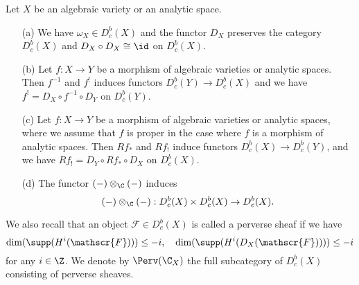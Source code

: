 \begin{theorem}\label{sheaf on LHS constructible sheaf functor prop}
Let $X$ be an algebraic variety or an analytic space.
\begin{enumerate}
    \item[(a)] We have $\omega_X\in D^b_c(X)$ and the functor $D_X$ preserves the category $D^b_c(X)$ and $D_X\circ D_X\cong\id$ on $D^b_c(X)$.
    \item[(b)] Let $f:X\to Y$ be a morphism of algebraic varieties or analytic spaces. Then $f^{-1}$ and $f^!$ induces functors $D^b_c(Y)\to D^b_c(X)$ and we have $f^!=D_X\circ f^{-1}\circ D_Y$ on $D^b_c(Y)$.
    \item[(c)] Let $f:X\to Y$ be a morphism of algebraic varieties or analytic spaces, where we assume that $f$ is proper in the case where $f$ is a morphism of analytic spaces. Then $Rf_*$ and $Rf_!$ induce functors $D^b_c(X)\to D^b_c(Y)$, and we have $Rf_!=D_Y\circ Rf_*\circ D_X$ on $D^b_c(X)$.
    \item[(d)] The functor $(-)\otimes_\C(-)$ induces
    \[(-)\otimes_\C(-):D^b_c(X)\times D^b_c(X)\to D^b_c(X).\] 
\end{enumerate}
\end{theorem}

We also recall that an object $\mathscr{F}\in D^b_c(X)$ is called a perverse sheaf if we have
\[\dim(\supp(H^i(\mathscr{F})))\leq -i,\quad \dim(\supp(H^i(D_X(\mathscr{F}))))\leq -i\]
for any $i\in\Z$. We denote by $\Perv(\C_X)$ the full subcategory of $D^b_c(X)$ consisting of perverse sheaves.

